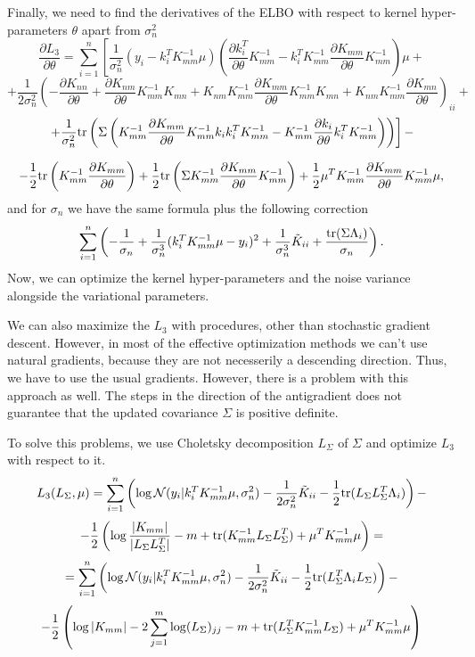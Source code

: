 \documentclass[12pt]{article}
\begin{document}
		Finally, we need to find the derivatives of the ELBO with respect to kernel hyper-parameters $\theta$ apart from $\sigma_n^2$
		$$\frac{\partial L_3} {\partial \theta} = \sum_{i = 1}^n \left [ \frac 1 {\sigma_n^2} (y_i - k_i^T K_{mm}^{-1} \mu) \left(\frac{\partial k_i^T}{\partial \theta} K_{mm}^{-1} - k_i^T K_{mm}^{-1} \frac{\partial K_{mm}}{\partial \theta} K_{mm}^{-1} \right)\mu + \right.$$
		$$\left. +\frac 1 {2 \sigma_n^2} \left (- \frac{\partial K_{nn}}{\partial \theta} +  \frac{\partial K_{nm}}{\partial \theta} K_{mm}^{-1} K_{mn} + K_{nm} K_{mm}^{-1} \frac{\partial K_{mm}}{\partial \theta} K_{mm}^{-1} K_{mn} + K_{nm} K_{mm}^{-1} \frac{\partial K_{mn}}{\partial \theta}\right)_ {ii} + \right.$$
		$$\left. +  \frac 1 {\sigma_n^2} \mbox{tr}\left( \Sigma \left( K_{mm}^{-1} \frac{\partial K_{mm}}{\partial \theta} K_{mm}^{-1} k_i k_i^T K_{mm}^{-1}  -  K_{mm}^{-1} \frac{\partial k_{i}}{\partial \theta}k_i^T K_{mm}^{-1}\right)\right)\right] - $$

		$$ - \frac 1 2 \mbox{tr}\left(K_{mm}^{-1} \frac{\partial K_{mm}}{\partial \theta}\right) + \frac 1 2 \mbox{tr}\left(\Sigma K_{mm}^{-1} \frac{\partial K_{mm}}{\partial \theta} K_{mm}^{-1} \right)+ \frac 1 2 \mu^T K_{mm}^{-1} \frac{\partial K_{mm}}{\partial \theta} K_{mm}^{-1}\mu,$$
		and for $\sigma_n$ we have the same formula plus the following correction
		$$\sum_{i = 1}^{n} \left(-\frac{1}{\sigma_n} + \frac 1 {\sigma_n^3} (k_i^T K_{mm}^{-1} \mu - y_i)^2 + \frac 1 {\sigma_n^3} \tilde K_{ii} + \frac {\mbox{tr}(\Sigma \Lambda_i)}{\sigma_n}\right).$$
		Now, we can optimize the kernel hyper-parameters and the noise variance alongside the variational parameters. 
		
		We can also maximize the $L_3$ with procedures, other than stochastic gradient descent. However, in most of the effective optimization methods we can't use natural gradients, because they are not necesserily a descending direction. Thus, we have to use the usual gradients. However, there is a problem with this approach as well. The steps in the direction of the antigradient does not guarantee that the updated covariance $\Sigma$ is positive definite. 

		To solve this problems, we use Choletsky decomposition $L_{\Sigma}$ of $\Sigma$ and optimize $L_3$ with respect to it.
		$$L_3(L_{\Sigma}, \mu) = \sum_{i = 1}^{n} \left( \log \mathcal{N}(y_i | k_i^T K_{mm}^{-1} \mu, \sigma_n^2) - \frac 1 {2 \sigma_n^2} \tilde K_{ii} - \frac 1 2 \mbox{tr} (L_{\Sigma} L_{\Sigma}^T \Lambda_i) \right) - $$
		$$ -\frac 1 2 \left (\log \frac {|K_{mm}|} {|L_{\Sigma} L_{\Sigma}^T|} - m + \mbox{tr}(K_{mm}^{-1} L_{\Sigma} L_{\Sigma}^T) + \mu^T K_{mm}^{-1} \mu \right) = $$
		$$ = \sum_{i = 1}^{n} \left( \log \mathcal{N}(y_i | k_i^T K_{mm}^{-1} \mu, \sigma_n^2) - \frac 1 {2 \sigma_n^2} \tilde K_{ii} - \frac 1 2 \mbox{tr} (L_{\Sigma}^T \Lambda_iL_{\Sigma}) \right) - $$
		$$ -\frac 1 2 \left (\log |K_{mm}| - 2 \sum_{j=1}^{m}\log (L_{\Sigma})_{jj} - m + \mbox{tr}(L_{\Sigma}^T K_{mm}^{-1} L_{\Sigma}) + \mu^T K_{mm}^{-1} \mu \right)$$
\end{document}
